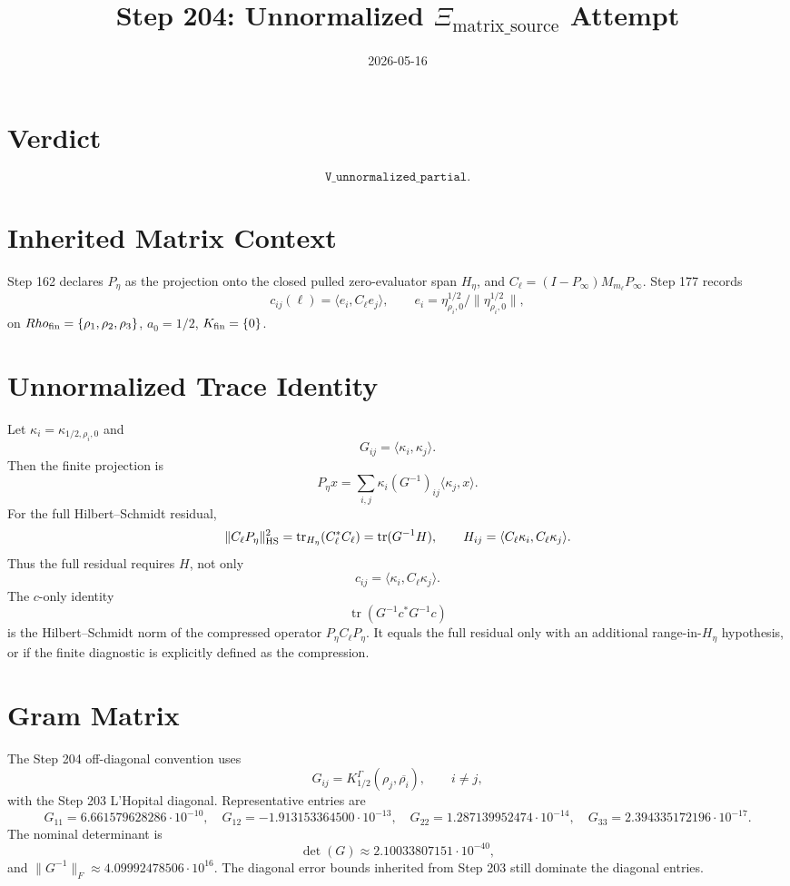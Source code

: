 \documentclass[11pt]{article}
\title{Step 204: Unnormalized \(\Xi_{\mathrm{matrix\_source}}\) Attempt}
\date{2026-05-16}
\begin{document}
\maketitle

\section*{Verdict}
\[
\boxed{\texttt{V\_unnormalized\_partial}.}
\]

\section*{Inherited Matrix Context}

Step 162 declares \(P_\eta\) as the projection onto the closed pulled
zero-evaluator span \(H_\eta\), and \(C_\ell=(I-P_\infty)M_{m_\ell}P_\infty\).
Step 177 records
\[
c_{ij}(\ell)=\langle e_i,C_\ell e_j\rangle,\qquad
e_i=\eta_{\rho_i,0}^{1/2}/\|\eta_{\rho_i,0}^{1/2}\|,
\]
on \(Rho_{\rm fin}=\{\rho_1,\rho_2,\rho_3\}\), \(a_0=1/2\), \(K_{\rm fin}=\{0\}\).

\section*{Unnormalized Trace Identity}

Let \(\kappa_i=\kappa_{1/2,\rho_i,0}\) and
\[
G_{ij}=\langle \kappa_i,\kappa_j\rangle.
\]
Then the finite projection is
\[
P_\eta x=\sum_{i,j}\kappa_i(G^{-1})_{ij}\langle \kappa_j,x\rangle.
\]
For the full Hilbert--Schmidt residual,
\[
\|C_\ell P_\eta\|_{\rm HS}^2
=\operatorname{tr}_{H_\eta}(C_\ell^*C_\ell)
=\operatorname{tr}(G^{-1}H),
\qquad
H_{ij}=\langle C_\ell\kappa_i,C_\ell\kappa_j\rangle.
\]
Thus the full residual requires \(H\), not only
\[
c_{ij}=\langle\kappa_i,C_\ell\kappa_j\rangle.
\]
The \(c\)-only identity
\[
\operatorname{tr}(G^{-1}c^*G^{-1}c)
\]
is the Hilbert--Schmidt norm of the compressed operator
\(P_\eta C_\ell P_\eta\).  It equals the full residual only with an additional
range-in-\(H_\eta\) hypothesis, or if the finite diagnostic is explicitly
defined as the compression.

\section*{Gram Matrix}

The Step 204 off-diagonal convention uses
\[
G_{ij}=K_{1/2}^{\Gamma}(\rho_j,\overline{\rho_i}),\qquad i\ne j,
\]
with the Step 203 L'Hopital diagonal.  Representative entries are
\[
G_{11}=6.661579628286\cdot10^{-10},\quad
G_{12}=-1.913153364500\cdot10^{-13},\quad
G_{22}=1.287139952474\cdot10^{-14},\quad
G_{33}=2.394335172196\cdot10^{-17}.
\]
The nominal determinant is
\[
\det(G)\approx 2.10033807151\cdot10^{-40},
\]
and \(\|G^{-1}\|_F\approx 4.09992478506\cdot10^{16}\).  The diagonal error
bounds inherited from Step 203 still dominate the diagonal entries.
\end{document}
